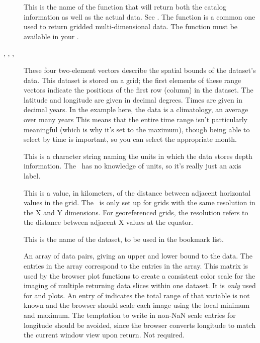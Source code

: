 \begin{description}
\item[] This is the name of the 
  function that will return both the catalog information as well as
  the actual data.  See .  The
   function is a common one used to return gridded
  multi-dimensional data.  The  function must be available
  in your .
  
\item[, , ,
  ] These four two-element vectors describe the
  spatial bounds of the dataset's data. This dataset is stored on a
  grid; the first elements of these range vectors indicate the
  positions of the first row (column) in the dataset. The latitude and
  longitude are given in decimal degrees.  Times are given in decimal
  years. In the example here, the data is a climatology, an average
  over many years This means that the entire time range isn't
  particularly meaningful (which is why it's set to the maximum),
  though being able to select by time is important, so you can select
  the appropriate month.

\item[] This is a character string naming the units in
  which the data stores depth information.  The \GUI\ has no knowledge
  of units, so it's really just an axis label.
  
\item[] This is a value, in kilometers, of the
  distance between adjacent horizontal values in the grid.  The \GUI\ 
  is only set up for grids with the same resolution in the X and Y
  dimensions.  For georeferenced grids, the resolution refers to the
  distance between adjacent X values at the equator.
  
\item[] This is the name of the dataset, to be used in
  the bookmark list. 
  
\item[] An array of data pairs, giving an upper and
  lower bound to the data.  The entries in the array correspond to the
  entries in the \lit{DataNull} array.  This matrix is used by the
  browser plot functions to create a consistent color scale for the
  imaging of multiple returning data slices within one dataset.  It is
  \emph{only} used for \lit{image} and \lit{pcolor} plots.  An entry
  of \lit{[NaN NaN]} indicates the total range of that variable is
  not known and the browser should scale each image using the local
  minimum and maximum.  The temptation to write in non-NaN scale
  entries for longitude should be avoided, since the browser
  converts longitude to match the current window view upon return.
  Not required.


\end{description}
